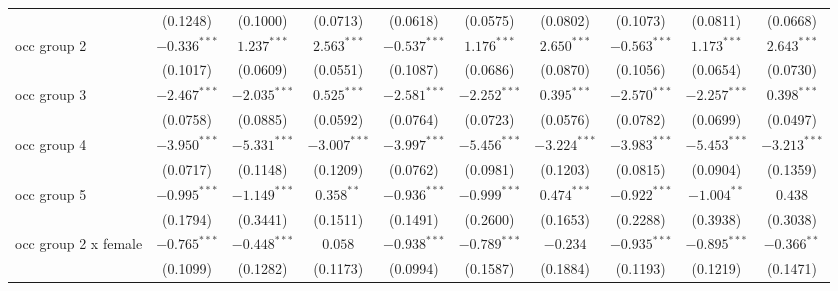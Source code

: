 \begin{tabular}{l|ccc|ccc|ccc|}
                           &                (0.1248) &        (0.1000) &        (0.0713) &                 (0.0618) &        (0.0575) &        (0.0802) &                 (0.1073) &        (0.0811) &        (0.0668) \\
occ group 2                &          $-0.336^{***}$ &   $1.237^{***}$ &   $2.563^{***}$ &           $-0.537^{***}$ &   $1.176^{***}$ &   $2.650^{***}$ &           $-0.563^{***}$ &   $1.173^{***}$ &   $2.643^{***}$ \\
                           &                (0.1017) &        (0.0609) &        (0.0551) &                 (0.1087) &        (0.0686) &        (0.0870) &                 (0.1056) &        (0.0654) &        (0.0730) \\
occ group 3                &          $-2.467^{***}$ &  $-2.035^{***}$ &   $0.525^{***}$ &           $-2.581^{***}$ &  $-2.252^{***}$ &   $0.395^{***}$ &           $-2.570^{***}$ &  $-2.257^{***}$ &   $0.398^{***}$ \\
                           &                (0.0758) &        (0.0885) &        (0.0592) &                 (0.0764) &        (0.0723) &        (0.0576) &                 (0.0782) &        (0.0699) &        (0.0497) \\
occ group 4                &          $-3.950^{***}$ &  $-5.331^{***}$ &  $-3.007^{***}$ &           $-3.997^{***}$ &  $-5.456^{***}$ &  $-3.224^{***}$ &           $-3.983^{***}$ &  $-5.453^{***}$ &  $-3.213^{***}$ \\
                           &                (0.0717) &        (0.1148) &        (0.1209) &                 (0.0762) &        (0.0981) &        (0.1203) &                 (0.0815) &        (0.0904) &        (0.1359) \\
occ group 5                &          $-0.995^{***}$ &  $-1.149^{***}$ &    $0.358^{**}$ &           $-0.936^{***}$ &  $-0.999^{***}$ &   $0.474^{***}$ &           $-0.922^{***}$ &   $-1.004^{**}$ &         $0.438$ \\
                           &                (0.1794) &        (0.3441) &        (0.1511) &                 (0.1491) &        (0.2600) &        (0.1653) &                 (0.2288) &        (0.3938) &        (0.3038) \\
occ group 2 x female       &          $-0.765^{***}$ &  $-0.448^{***}$ &         $0.058$ &           $-0.938^{***}$ &  $-0.789^{***}$ &        $-0.234$ &           $-0.935^{***}$ &  $-0.895^{***}$ &   $-0.366^{**}$ \\
                           &                (0.1099) &        (0.1282) &        (0.1173) &                 (0.0994) &        (0.1587) &        (0.1884) &                 (0.1193) &        (0.1219) &        (0.1471) \\

\end{tabular}
